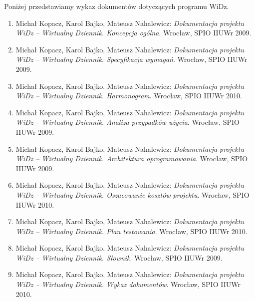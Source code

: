\documentclass[12pt,leqno,twoside]{mwart}
\begin{document}
\newpage
\vspace{3cm}
Poniżej przedstawiamy wykaz dokumentów dotyczących programu WiDz.
\vspace{0.2cm}
\begin{enumerate}
  \item Michał Kopacz, Karol Bajko, Mateusz Nahalewicz: {\it Dokumentacja projektu WiDz -- Wirtualny Dziennik. Koncepcja ogólna}. Wrocław, SPIO IIUWr 2009.
  \item Michał Kopacz, Karol Bajko, Mateusz Nahalewicz: {\it Dokumentacja projektu WiDz -- Wirtualny Dziennik. Specyfikacja wymagań}. Wrocław, SPIO IIUWr 2009.
  \item Michał Kopacz, Karol Bajko, Mateusz Nahalewicz: {\it Dokumentacja projektu WiDz -- Wirtualny Dziennik. Harmonogram}. Wrocław, SPIO IIUWr 2010.
  \item Michał Kopacz, Karol Bajko, Mateusz Nahalewicz: {\it Dokumentacja projektu WiDz -- Wirtualny Dziennik. Analiza przypadków użycia}. Wrocław, SPIO IIUWr 2009.
  \item Michał Kopacz, Karol Bajko, Mateusz Nahalewicz: {\it Dokumentacja projektu WiDz -- Wirtualny Dziennik. Architektura oprogramowania}. Wrocław, SPIO IIUWr 2009.
  \item Michał Kopacz, Karol Bajko, Mateusz Nahalewicz: {\it Dokumentacja projektu WiDz -- Wirtualny Dziennik. Oszacowanie kosztów projektu}. Wrocław, SPIO IIUWr 2010.
  \item Michał Kopacz, Karol Bajko, Mateusz Nahalewicz: {\it Dokumentacja projektu WiDz -- Wirtualny Dziennik. Plan testowania}. Wrocław, SPIO IIUWr 2010.
  \item Michał Kopacz, Karol Bajko, Mateusz Nahalewicz: {\it Dokumentacja projektu WiDz -- Wirtualny Dziennik. Słownik}. Wrocław, SPIO IIUWr 2009.
  \item Michał Kopacz, Karol Bajko, Mateusz Nahalewicz: {\it Dokumentacja projektu WiDz -- Wirtualny Dziennik. Wykaz dokumentów}. Wrocław, SPIO IIUWr 2010.
\end{enumerate}
	
\end{document}
